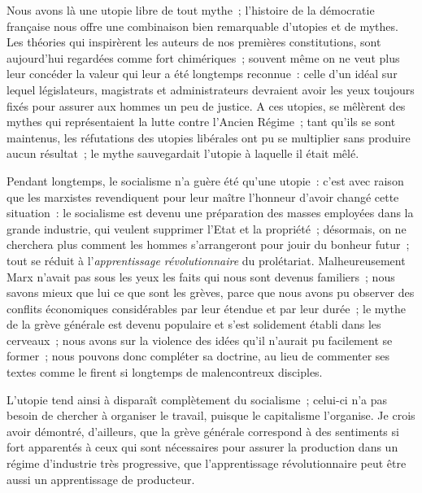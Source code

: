\documentclass[french,twoside]{book} %
\begin{document}
Nous avons là une utopie libre de tout mythe ; l’histoire  de la démocratie française nous offre une combinaison bien remarquable d’utopies et de mythes. Les théories qui inspirèrent les auteurs de nos premières constitutions, sont aujourd’hui regardées comme fort chimériques ; souvent même on ne veut plus leur concéder la valeur qui leur a été longtemps reconnue : celle d’un idéal sur lequel législateurs, magistrats et administrateurs devraient avoir les yeux toujours fixés pour assurer aux hommes un peu de justice. A ces utopies, se mêlèrent des mythes qui représentaient la lutte contre l’Ancien Régime ; tant qu’ils se sont maintenus, les réfutations des utopies libérales ont pu se multiplier sans produire aucun résultat ; le mythe sauvegardait l’utopie à laquelle il était mêlé.\par
Pendant longtemps, le socialisme n’a guère été qu’une utopie : c’est avec raison que les marxistes revendiquent pour leur maître l’honneur d’avoir changé cette situation : le socialisme est devenu une préparation des masses employées dans la grande industrie, qui veulent supprimer l’Etat et la propriété ; désormais, on ne cherchera plus comment les hommes s’arrangeront pour jouir du bonheur futur ; tout se réduit à l’\emph{apprentissage révolutionnaire} du prolétariat. Malheureusement Marx n’avait pas sous les yeux les faits qui nous sont devenus familiers ; nous savons mieux que lui ce que sont les grèves, parce que nous avons pu observer des conflits économiques considérables par leur étendue et par leur durée ; le mythe de la grève générale est devenu populaire et s’est solidement établi dans les cerveaux ; nous avons sur la violence des idées qu’il n’aurait pu facilement se former ; nous pouvons donc compléter sa doctrine, au lieu de  commenter ses textes comme le firent si longtemps de malencontreux disciples.\par
L’utopie tend ainsi à disparaît complètement du socialisme ; celui-ci n’a pas besoin de chercher à organiser le travail, puisque le capitalisme l’organise. Je crois avoir démontré, d’ailleurs, que la grève générale correspond à des sentiments si fort apparentés à ceux qui sont nécessaires pour assurer la production dans un régime d’industrie très progressive, que l’apprentissage révolutionnaire peut être aussi un apprentissage de producteur.\par
\end{document}
